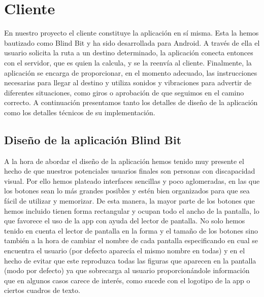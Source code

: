 


\section{Cliente}
\label{sec:cliente}
En nuestro proyecto el cliente constituye la aplicación en sí misma. Esta la hemos bautizado como Blind Bit y ha sido desarrollada para Android. A través de ella el usuario solicita la ruta a un destino determinado, la aplicación conecta entonces con el servidor, que es quien la calcula, y se la reenvía al cliente. Finalmente, la aplicación se encarga de proporcionar, en el momento adecuado, las instrucciones necesarias para llegar al destino y utiliza sonidos y vibraciones para advertir de diferentes situaciones, como giros o aprobación de que seguimos en el camino correcto. A continuación presentamos tanto los detalles de diseño de la aplicación como los detalles técnicos de su implementación. 


\subsection{Diseño de la aplicación Blind Bit}
\label{sub:diseño}

A la hora de abordar el diseño de la aplicación hemos tenido muy presente el hecho de que nuestros potenciales usuarios finales son personas con discapacidad visual. Por ello hemos plateado interfaces sencillas y poco aglomeradas, en las que los botones sean lo más grandes posibles y estén bien organizados para que sea fácil de utilizar y memorizar. De esta manera, la mayor parte de los botones que hemos incluido tienen forma rectangular y ocupan todo el ancho de la pantalla, lo que favorece el uso de la app con ayuda del lector de pantalla. No solo hemos tenido en cuenta el lector de pantalla en la forma y el tamaño de los botones sino también a la hora de cambiar el nombre de cada pantalla especificando en cual se encuentra el usuario (por defecto aparecía el mismo nombre en todas) y en el hecho de evitar que este reproduzca todas las figuras que aparecen en la pantalla (modo por defecto) ya que sobrecarga al usuario proporcionándole información que en algunos casos carece de interés, como sucede con el logotipo de la app o ciertos cuadros de texto.

